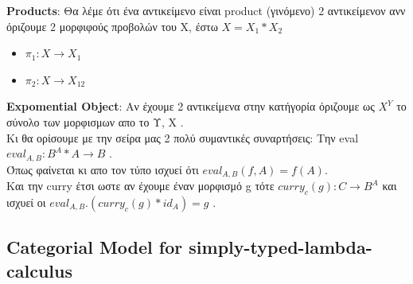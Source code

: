\documentclass[hyperref={pdfpagelabels=false}]{beamer}
\begin{document}
\begin{frame}
	\textbf{	Products}:
Θα λέμε ότι ένα αντικείμενο είναι product (γινόμενο) 2 αντικείμενον ανν όριζουμε 2 μορφιφούς προβολών του Χ, έστω $X=X_1*X_2$
\\ \begin{itemize}
        \item {$\pi_1 : X\rightarrow X_1$ }
        \item <2-> {$\pi_2 : X\rightarrow X_12$}
\end{itemize}

\end{frame}

\begin{frame}
	\textbf{Expomential Object}:
Αν έχουμε 2 αντικείμενα στην κατήγορία όριζουμε ως $X^Y$ το σύνολο των μορφισμων απο το Υ, Χ .
\\Κι θα ορίσουμε με την σείρα μας 2 πολύ συμαντικές συναρτήσεις:
Την eval $eval_{A,B}: B^A * A \rightarrow B$ .\\ Όπως φαίνεται κι απο τον τύπο
ισχυεί ότι $eval_{A,B}(f,A)=f(A)$.
\\ Και την curry έτσι ωστε αν έχουμε έναν μορφισμό g τότε $curry_c(g) : C\rightarrow B^A$ και ισχυεί οι $eval_{A,B}.(curry_c(g)*id_A)=g$ .
\end{frame}

\subsection{Categorial Model for simply-typed-lambda-calculus}
\end{document}

